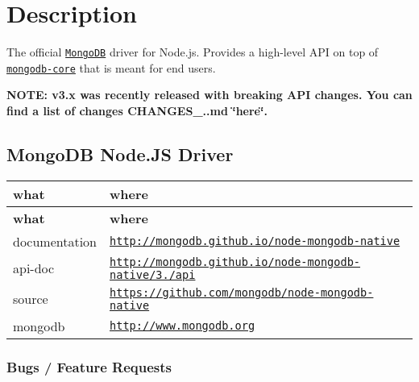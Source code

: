 \href{https://nodei.co/npm/mongodb/}{\tt } \href{https://nodei.co/npm/mongodb/}{\tt }

\href{http://travis-ci.org/mongodb/node-mongodb-native}{\tt } \href{https://coveralls.io/github/mongodb/node-mongodb-native?branch=2.1}{\tt } \href{https://gitter.im/mongodb/node-mongodb-native?utm_source=badge&utm_medium=badge&utm_campaign=pr-badge}{\tt }

\section*{Description}

The official \href{https://www.mongodb.com/}{\tt Mongo\+DB} driver for Node.\+js. Provides a high-\/level A\+PI on top of \href{https://www.npmjs.com/package/mongodb-core}{\tt mongodb-\/core} that is meant for end users.

{\bfseries N\+O\+TE\+: v3.\+x was recently released with breaking A\+PI changes. You can find a list of changes C\+H\+A\+N\+G\+E\+S\+\_..\+md \char`\"{}here\char`\"{}.}

\subsection*{Mongo\+DB Node.\+JS Driver}

\tabulinesep=1mm
\begin{longtabu} spread 0pt [c]{*{2}{|X[-1]}|}
\hline
\rowcolor{\tableheadbgcolor}\textbf{ what  }&\textbf{ where   }\\
\endfirsthead
\hline
\endfoot
\hline
\rowcolor{\tableheadbgcolor}\textbf{ what  }&\textbf{ where   }\\
\endhead
documentation  &\href{http://mongodb.github.io/node-mongodb-native}{\tt http\+://mongodb.\+github.\+io/node-\/mongodb-\/native}   \\
api-\/doc  &\href{http://mongodb.github.io/node-mongodb-native/3.1/api}{\tt http\+://mongodb.\+github.\+io/node-\/mongodb-\/native/3./api}   \\
source  &\href{https://github.com/mongodb/node-mongodb-native}{\tt https\+://github.\+com/mongodb/node-\/mongodb-\/native}   \\
mongodb  &\href{http://www.mongodb.org}{\tt http\+://www.\+mongodb.\+org}   \\
\end{longtabu}


\subsubsection*{Bugs / Feature Requests}

